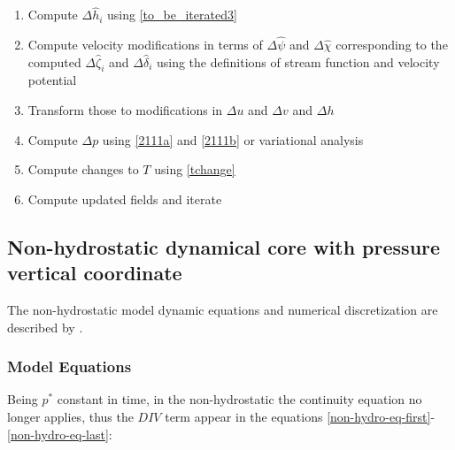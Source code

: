 \begin{enumerate}
  \item Compute $\Delta \hat{h}_i$ using \ref{to_be_iterated3}
  \item Compute velocity modifications in terms of $\Delta \hat{\psi}$
    and $\Delta \hat{\chi}$ corresponding to the computed
    $\Delta \hat{\zeta}_i$ and $\Delta \hat{\delta}_i$ using the
    definitions of stream function and velocity potential
  \item Transform those to modifications in $\Delta u$ and $\Delta v$
    and $\Delta h$
  \item Compute $\Delta p$ using \ref{2111a} and \ref{2111b} or
    \cite{Daley} variational analysis
  \item Compute changes to $T$ using \ref{tchange}
  \item Compute updated fields and iterate
\end{enumerate}

\newpage

\subsection{Non-hydrostatic dynamical core with pressure vertical coordinate}
The non-hydrostatic model dynamic equations and numerical discretization are
described by \cite{Grell_94}.

\subsubsection{Model Equations}

Being $p^{\ast}$ constant in time, in the non-hydrostatic the continuity
equation no longer applies, thus the $DIV$ term appear in the equations
\ref{non-hydro-eq-first}-\ref{non-hydro-eq-last}:

